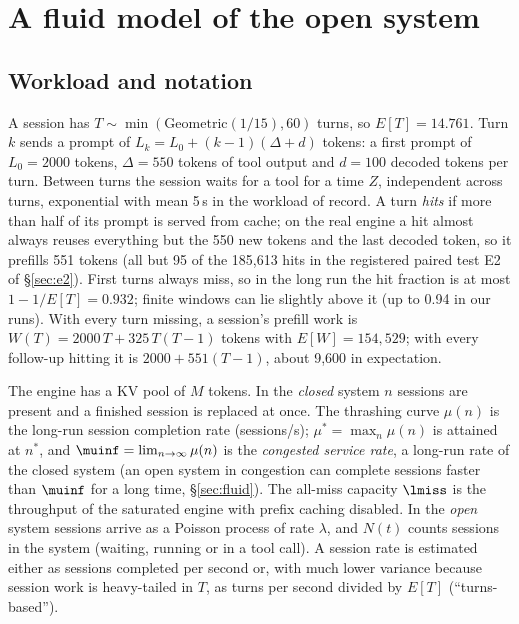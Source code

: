 \section{A fluid model of the open system}\label{sec:model}

\subsection{Workload and notation}\label{sec:notation}
A session has $T\sim\min(\mathrm{Geometric}(1/15),60)$ turns, so $E[T]=14.761$. Turn $k$ sends a prompt of $L_k=L_0+(k-1)(\Delta+d)$ tokens: a first prompt of $L_0=2000$ tokens, $\Delta=550$ tokens of tool output and $d=100$ decoded tokens per turn. Between turns the session waits for a tool for a time $Z$, independent across turns, exponential with mean 5\,s in the workload of record. A turn \emph{hits} if more than half of its prompt is served from cache; on the real engine a hit almost always reuses everything but the 550 new tokens and the last decoded token, so it prefills 551 tokens (all but 95 of the 185,613 hits in the registered paired test E2 of \S\ref{sec:e2}). First turns always miss, so in the long run the hit fraction is at most $1-1/E[T]=0.932$; finite windows can lie slightly above it (up to 0.94 in our runs). With every turn missing, a session's prefill work is $W(T)=2000\,T+325\,T(T-1)$ tokens with $E[W]=154{,}529$; with every follow-up hitting it is $2000+551(T-1)$, about 9,600 in expectation.

The engine has a KV pool of $M$ tokens. In the \emph{closed} system $n$ sessions are present and a finished session is replaced at once. The thrashing curve $\mu(n)$ is the long-run session completion rate (sessions/s); $\mu^*=\max_n\mu(n)$ is attained at $n^*$, and $\muinf=\lim_{n\to\infty}\mu(n)$ is the \emph{congested service rate}, a long-run rate of the closed system (an open system in congestion can complete sessions faster than $\muinf$ for a long time, \S\ref{sec:fluid}). The all-miss capacity $\lmiss$ is the throughput of the saturated engine with prefix caching disabled. In the \emph{open} system sessions arrive as a Poisson process of rate $\lambda$, and $N(t)$ counts sessions in the system (waiting, running or in a tool call). A session rate is estimated either as sessions completed per second or, with much lower variance because session work is heavy-tailed in $T$, as turns per second divided by $E[T]$ (``turns-based'').

